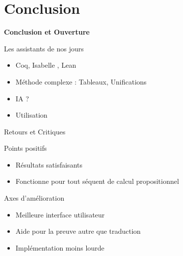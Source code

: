 \documentclass{beamer}
\begin{document}
\section{Conclusion}


\begin{frame}
  \centering
  \vfill
  {\LARGE \textbf{Conclusion et Ouverture}}
  \vfill
\end{frame}



\begin{frame}{Les assistants de nos jours}

    
    \begin{itemize}
        \item Coq, Isabelle , Lean
        \item Méthode complexe : Tableaux, Unifications
        \item IA ?
        \item Utilisation 
    \end{itemize}
    
\end{frame}


\begin{frame}{Retours et Critiques}

    \begin{block}{Points positifs}
        \begin{itemize}
            \item Résultats satisfaisants
            \item Fonctionne pour tout séquent de calcul propositionnel
        \end{itemize}        
    \end{block}
    \vspace{1cm}
    \begin{block}{Axes d'amélioration}
        \begin{itemize}
            \item Meilleure interface utilisateur
            \item Aide pour la preuve autre que traduction
            \item Implémentation moins lourde
        \end{itemize}
        
    \end{block}
    
    
    
\end{frame}
\end{document}
